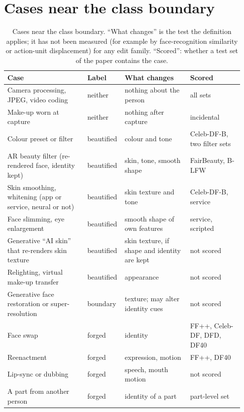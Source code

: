 \documentclass[10pt]{article}
\begin{document}
\section{Cases near the class boundary}
\label{sec:labels}
\begin{table}[H]
\centering
\caption{Cases near the class boundary. ``What changes'' is the test the definition applies; it has not been measured
(for example by face-recognition similarity or action-unit displacement) for any edit family. ``Scored'': whether a test set
of the paper contains the case.}
\label{tab:labels}
\footnotesize
\setlength{\tabcolsep}{3pt}
\begin{tabular}{@{}>{\raggedright\arraybackslash}p{0.33\linewidth}>{\raggedright\arraybackslash}p{0.13\linewidth}>{\raggedright\arraybackslash}p{0.27\linewidth}>{\raggedright\arraybackslash}p{0.22\linewidth}@{}}
\toprule
Case & Label & What changes & Scored \\
\midrule
Camera processing, JPEG, video coding & neither & nothing about the person & all sets \\
Make-up worn at capture & neither & nothing after capture & incidental \\
Colour preset or filter & beautified & colour and tone & Celeb-DF-B, two filter sets \\
AR beauty filter (re-rendered face, identity kept) & beautified & skin, tone, smooth shape & FairBeauty, B-LFW \\
Skin smoothing, whitening (app or service, neural or not) & beautified & skin texture and tone & Celeb-DF-B, service \\
Face slimming, eye enlargement & beautified & smooth shape of own features & service, scripted \\
Generative ``AI skin'' that re-renders skin texture & beautified & skin texture, if shape and identity are kept & not scored \\
Relighting, virtual make-up transfer & beautified & appearance & not scored \\
Generative face restoration or super-resolution & boundary & texture; may alter identity cues & not scored \\
Face swap & forged & identity & FF++, Celeb-DF, DFD, DF40 \\
Reenactment & forged & expression, motion & FF++, DF40 \\
Lip-sync or dubbing & forged & speech, mouth motion & not scored \\
A part from another person & forged & identity of a part & part-level set \\

\end{tabular}
\end{table}
\end{document}
